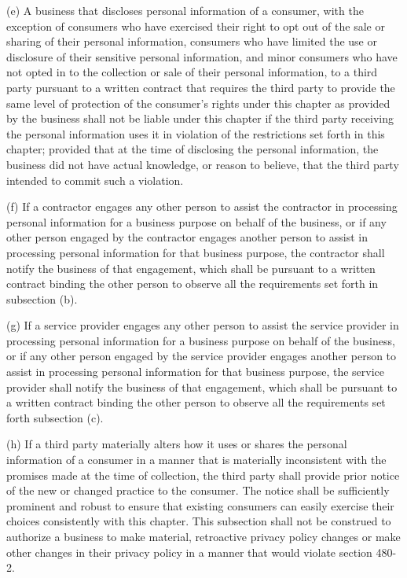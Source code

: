      (e)  A business that discloses personal information of a consumer, with the exception of consumers who have exercised their right to opt out of the sale or sharing of their personal information, consumers who have limited the use or disclosure of their sensitive personal information, and minor consumers who have not opted in to the collection or sale of their personal information, to a third party pursuant to a written contract that requires the third party to provide the same level of protection of the consumer's rights under this chapter as provided by the business shall not be liable under this chapter if the third party receiving the personal information uses it in violation of the restrictions set forth in this chapter; provided that at the time of disclosing the personal information, the business did not have actual knowledge, or reason to believe, that the third party intended to commit such a violation.

     (f)  If a contractor engages any other person to assist the contractor in processing personal information for a business purpose on behalf of the business, or if any other person engaged by the contractor engages another person to assist in processing personal information for that business purpose, the contractor shall notify the business of that engagement, which shall be pursuant to a written contract binding the other person to observe all the requirements set forth in subsection (b).

     (g)  If a service provider engages any other person to assist the service provider in processing personal information for a business purpose on behalf of the business, or if any other person engaged by the service provider engages another person to assist in processing personal information for that business purpose, the service provider shall notify the business of that engagement, which shall be pursuant to a written contract binding the other person to observe all the requirements set forth subsection (c).

     (h)  If a third party materially alters how it uses or shares the personal information of a consumer in a manner that is materially inconsistent with the promises made at the time of collection, the third party shall provide prior notice of the new or changed practice to the consumer.  The notice shall be sufficiently prominent and robust to ensure that existing consumers can easily exercise their choices consistently with this chapter.  This subsection shall not be construed to authorize a business to make material, retroactive privacy policy changes or make other changes in their privacy policy in a manner that would violate section 480-2.

